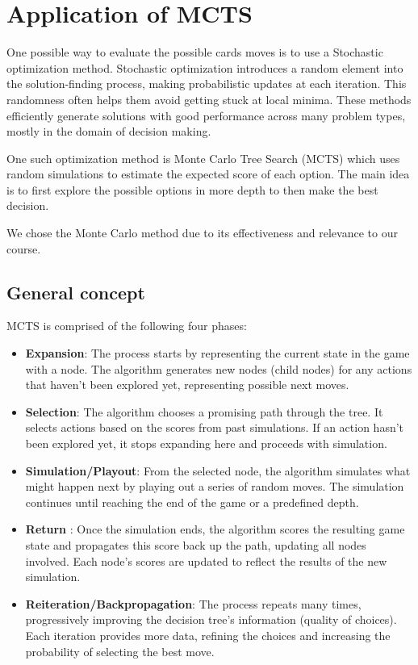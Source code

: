 \chapter{Application of MCTS}
One possible way to evaluate the possible cards moves is to use a Stochastic optimization method. Stochastic optimization introduces a random element into the solution-finding process, making probabilistic updates at each iteration. This randomness often helps them avoid getting stuck at local minima. These methods efficiently generate solutions with good performance across many problem types, mostly in the domain of decision making. 

One such optimization method is Monte Carlo Tree Search (MCTS)\cite{6145622} which uses random simulations to estimate the expected score of each option.
The main idea is to first explore the possible options in more depth to then make the best decision.

We chose the Monte Carlo method due to its effectiveness and relevance to our course.

\section{General concept}

MCTS is comprised of the following four phases:

\begin{itemize}
    \item \textbf{Expansion}: The process starts by representing the current state in the game with a node. The algorithm generates new nodes (child nodes) for any actions that haven’t been explored yet, representing possible next moves.
    \item \textbf{Selection}: The algorithm chooses a promising path through the tree. It selects actions based on the scores from past simulations. If an action hasn't been explored yet, it stops expanding here and proceeds with simulation.
    \item \textbf{Simulation/Playout}: From the selected node, the algorithm simulates what might happen next by playing out a series of random moves. The simulation continues until reaching the end of the game or a predefined depth.
    \item \textbf{Return} : Once the simulation ends, the algorithm scores the resulting game state and propagates this score back up the path, updating all nodes involved. Each node's scores are updated to reflect the results of the new simulation.
    \item \textbf{Reiteration/Backpropagation}: The process repeats many times, progressively improving the decision tree's information (quality of choices). Each iteration provides more data, refining the choices and increasing the probability of selecting the best move.
\end{itemize}

